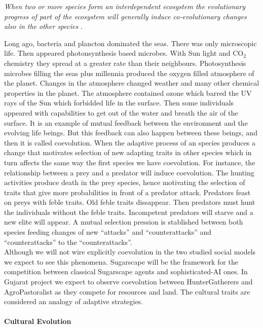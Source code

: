 \documentclass[11pt,oneside,a4paper,openright]{report}
\begin{document}
\textit{When two or more species form an interdependent ecosystem the evolutionary progress of part of the ecosystem will generally induce co-evolutionary changes also in the other species} \cite[p.154]{Gross2008}.

Long ago, bacteria and plancton dominated the seas. There was only microscopic life. Then appeared photonsynthesis
based microbes. With Sun light and CO$_2$ chemistry they spread at a greater rate than their neighbours. Photosynthesis
microbes filling the seas plus millennia produced the oxygen filled atmosphere of the planet. Changes in the atmosphere
changed weather and many other chemical properties in the planet. The atmosphere contained ozone which barred the 
UV rays of the Sun which forbidded life in the surface. Then some individuals appeared with capabilities to get out of 
the water and breath the air of the surface. It is an example of mutual feedback between the environment and the evolving 
life beings. But this feedback can also happen between these beings, and then it is called coevolution\cite{Dawkins1990}.
When the adaptive process of an species produces a change that motivates selection of new adapting traits in other
species which in turn affects the same way the first species we have coevolution. For instance, the relationship 
between a prey and a predator will induce coevolution. The hunting activities produce death in the prey species, hence
motivating the selection of traits that give more probabilities in front of a predator attack. Predators feast on preys 
with feble traits. Old feble traits dissappear. Then predators must hunt the individuals without the feble traits. Incompetent predators will starve and a new elite will appear. A mutual selection pression is stablished between both species feeding changes of new ``attacks'' and ``counterattacks'' and ``counterattacks'' to the ``counterattacks''.\\

Although we will not wire explicitly coevolution in the two studied social models we expect to see this phenomena. Sugarscape will be the framework for the competition between classical Sugarscape agents and sophisticated-AI ones. In Gujarat project we expect to observe coevolution between HunterGatherers and AgroPastoralist as they compete for resources and land. The cultural traits are considered an analogy of adaptive strategies. 


\paragraph{Cultural Evolution}
\end{document}
